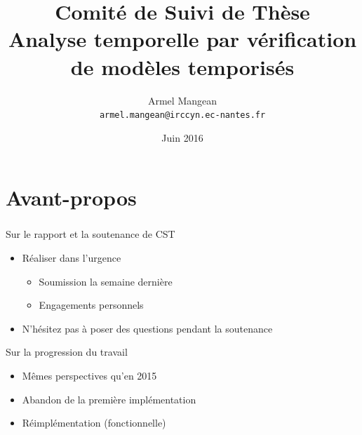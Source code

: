 \documentclass{beamer}
\title{%
  Comité de Suivi de Thèse \\
  {\bf Analyse temporelle par vérification de modèles temporisés}}
\author{%
  Armel Mangean \\
  {\small\tt armel.mangean@irccyn.ec-nantes.fr}}
\institute{%
  École Centrale de Nantes \\
  IRCCyN, équipe Sytème Temps-Réel}
\date{Juin 2016}
\begin{document}
  \begin{frame}
    \small
    \titlepage
  \end{frame}

  \section*{Avant-propos}
  \begin{frame}
    \frametitle{\secname}
    
    \vfill
    Sur le rapport et la soutenance de CST
    \begin{itemize}
      \item Réaliser dans l'urgence
      \begin{itemize}
        \item Soumission la semaine dernière
        \item {\color{gray} Engagements personnels}
      \end{itemize}
      \item N'hésitez pas à poser des questions pendant la soutenance
    \end{itemize}
    \pause

    \vfill
    Sur la progression du travail
    \begin{itemize}
      \item Mêmes perspectives qu'en 2015
      \item Abandon de la première implémentation
      \item Réimplémentation (fonctionnelle)
    \end{itemize}

    \vfill
  \end{frame}
\end{document}
